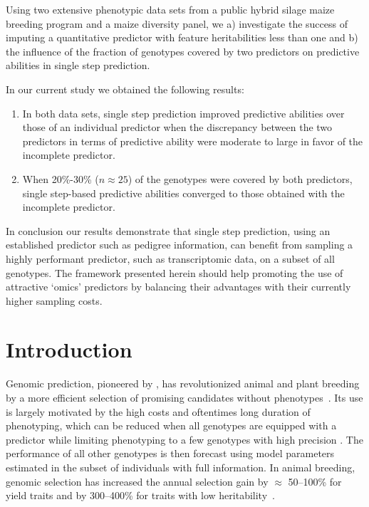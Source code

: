 \documentclass[12pt,titlepage]{article}
\begin{document}
Using two extensive phenotypic data sets from a public hybrid silage maize
breeding program and a maize diversity panel, we a) investigate the success of
imputing a quantitative predictor with feature heritabilities less than one and
b) the influence of the fraction of genotypes covered by two predictors on
predictive abilities in single step prediction.

In our current study we obtained the following results:

\begin{enumerate}
\item In both data sets, single step prediction improved predictive abilities
	over those of an individual predictor when the discrepancy between the
	two predictors in terms of predictive ability were moderate to large in
	favor of the incomplete predictor.
\item When 20\%-30\% ($n \approx 25$) of the genotypes were covered by both
	predictors, single step-based predictive abilities converged to those
	obtained with the incomplete predictor.
\end{enumerate}

In conclusion our results demonstrate that single step prediction, using
an established predictor such as pedigree information, can benefit from sampling
a highly performant predictor, such as transcriptomic data, on a subset of all
genotypes.
The framework presented herein should help promoting the use of attractive
`omics' predictors by balancing their advantages with their currently higher
sampling costs.



\section{Introduction}
Genomic prediction, pioneered by , has revolutionized
animal and plant breeding by a more efficient selection of promising candidates 
without phenotypes~\cite{DeLosCampos2013,Garcia-Ruiz2016}.
Its use is largely motivated by the high costs and oftentimes long duration of 
phenotyping, which can be reduced when all genotypes are equipped with a predictor 
while limiting phenotyping to a few genotypes with high precision
\cite{Kadam2016}.
The performance of all other genotypes is then forecast using model parameters
estimated in the subset of individuals with full information.
In animal breeding, genomic selection has increased the annual selection gain 
by $\approx$ 50--100\% for yield traits and by 300--400\% for traits with low 
heritability~\cite{Garcia-Ruiz2016}.
\end{document}
